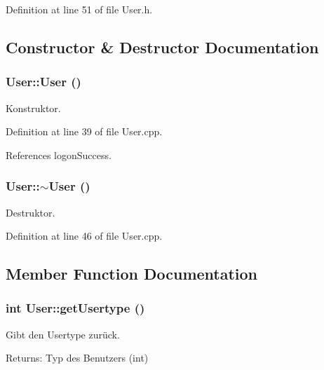 Definition at line 51 of file User.h.

\subsection{Constructor \& Destructor Documentation}
\hypertarget{class_user_4a0137053e591fbb79d9057dd7d2283d}{
\subsubsection[User]{\setlength{\rightskip}{0pt plus 5cm}User::User ()}}
\label{class_user_4a0137053e591fbb79d9057dd7d2283d}


Konstruktor. 



Definition at line 39 of file User.cpp.

References logonSuccess.\hypertarget{class_user_c00b72ad64eb4149f7b21b9f5468c2b2}{
\subsubsection[$\sim$User]{\setlength{\rightskip}{0pt plus 5cm}User::$\sim$User ()}}
\label{class_user_c00b72ad64eb4149f7b21b9f5468c2b2}


Destruktor. 



Definition at line 46 of file User.cpp.

\subsection{Member Function Documentation}
\hypertarget{class_user_f6482cc57caa04a2c718fb059b2c1336}{
\subsubsection[getUsertype]{\setlength{\rightskip}{0pt plus 5cm}int User::getUsertype ()}}
\label{class_user_f6482cc57caa04a2c718fb059b2c1336}


Gibt den Usertype zurück. 

\begin{Desc}
\item[Returns:]Typ des Benutzers (int) \end{Desc}


